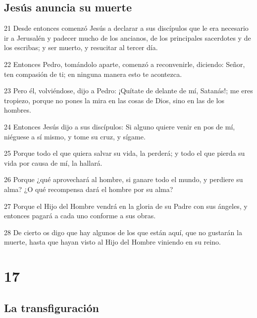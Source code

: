 \section*{Jesús anuncia su muerte}

\par 21 Desde entonces comenzó Jesús a declarar a sus discípulos que le era necesario ir a Jerusalén y padecer mucho de los ancianos, de los principales sacerdotes y de los escribas; y ser muerto, y resucitar al tercer día.
\par 22 Entonces Pedro, tomándolo aparte, comenzó a reconvenirle, diciendo: Señor, ten compasión de ti; en ninguna manera esto te acontezca.
\par 23 Pero él, volviéndose, dijo a Pedro: ¡Quítate de delante de mí, Satanás!; me eres tropiezo, porque no pones la mira en las cosas de Dios, sino en las de los hombres.
\par 24 Entonces Jesús dijo a sus discípulos: Si alguno quiere venir en pos de mí, niéguese a sí mismo, y tome su cruz, y sígame.
\par 25 Porque todo el que quiera salvar su vida, la perderá; y todo el que pierda su vida por causa de mí, la hallará.
\par 26 Porque ¿qué aprovechará al hombre, si ganare todo el mundo, y perdiere su alma? ¿O qué recompensa dará el hombre por su alma?
\par 27 Porque el Hijo del Hombre vendrá en la gloria de su Padre con sus ángeles, y entonces pagará a cada uno conforme a sus obras.
\par 28 De cierto os digo que hay algunos de los que están aquí, que no gustarán la muerte, hasta que hayan visto al Hijo del Hombre viniendo en su reino.

\chapter{17}

\section*{La transfiguración}

